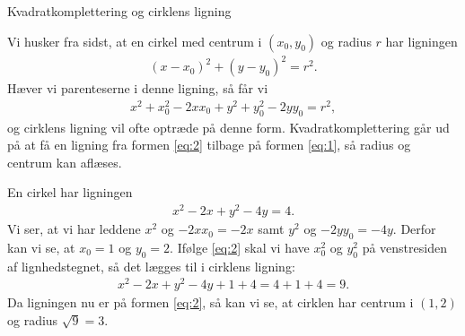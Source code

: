\begin{center}
\Huge
Kvadratkomplettering og cirklens ligning
\end{center}

Vi husker fra sidst, at en cirkel med centrum i $(x_0,y_0)$ og radius $r$ har ligningen
\begin{align}\label{eq:1}
	(x-x_0)^2 + (y-y_0)^2 = r^2.
\end{align}
Hæver vi parenteserne i denne ligning, så får vi
\begin{align}\label{eq:2}
	x^2+x_0^2-2xx_0 + y^2+y_0^2-2yy_0 = r^2,
\end{align}
og cirklens ligning vil ofte optræde på denne form. Kvadratkomplettering går ud på at få en ligning fra formen \eqref{eq:2} tilbage på formen \eqref{eq:1}, så radius og centrum kan aflæses.

\begin{exa}
	En cirkel har ligningen 
	\begin{align*}
		x^2-2x+y^2-4y=4.
	\end{align*}
	Vi ser, at vi har leddene $x^2$ og $-2xx_0 = -2x$ samt $y^2$ og $-2yy_0=-4y$. Derfor kan vi se, at $x_0 = 1$ og $y_0 = 2$. Ifølge \eqref{eq:2} skal vi have $x_0^2$
    og $y_0^2$ på venstresiden af lignhedstegnet, så det lægges til i cirklens ligning:
    \begin{align*}
    		x^2-2x+y^2-4y+1+4=4+1+4=9. 
    \end{align*}
   	Da ligningen nu er på formen \eqref{eq:2}, så kan vi se, at cirklen har centrum i $(1,2)$ og radius $\sqrt{9} = 3$.
\end{exa}




